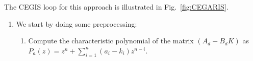 \documentclass[twocolumn]{autart}    %
\newcommand{\mat}[1]{\boldsymbol{#1}}
\begin{document}
The CEGIS loop for this approach is illustrated in Fig.~\ref{fig:CEGARIS}.



\begin{enumerate}
\item 
  We start by doing some preprocessing:%
  \begin{enumerate}
\item Compute the characteristic polynomial of the matrix $(A_d-B_dK)$ as 
$P_a(z) = z^n+\sum_{i=1}^n{(a_i-k_i)z^{n-i}}$. 




\end{enumerate}
\end{enumerate}
\end{document}
